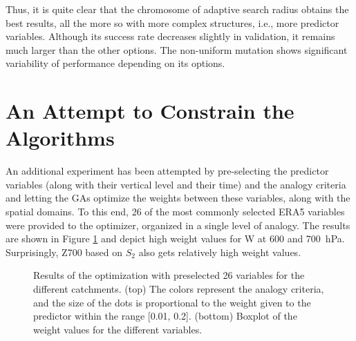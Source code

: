 \documentclass[draft]{agujournal2019}
\begin{document}
Thus, it is quite clear that the chromosome of adaptive search radius obtains the best results, all the more so with more complex structures, i.e., more predictor variables. Although its success rate decreases slightly in validation, it remains much larger than the other options. The non-uniform mutation shows significant variability of performance depending on its options.

\FloatBarrier

\section{An Attempt to Constrain the Algorithms}

An additional experiment has been attempted by pre-selecting the predictor variables (along with their vertical level and their time) and the analogy criteria and letting the GAs optimize the weights between these variables, along with the spatial domains. To this end, 26 of the most commonly selected ERA5 variables were provided to the optimizer, organized in a single level of analogy. The results are shown in Figure \ref{fig_variables_homogen} and depict high weight values for W at 600 and 700~hPa. Surprisingly, Z700 based on $S_{2}$ also gets relatively high weight values.

\begin{figure}[H]
	\noindent{}
	\vspace{-0.8cm}
	\caption{Results of the optimization with preselected 26 variables for the different catchments. (top) The colors represent the analogy criteria, and the size of the dots is proportional to the weight given to the predictor within the range [0.01, 0.2]. (bottom) Boxplot of the weight values for the different variables.}
	\label{fig_variables_homogen}
\end{figure}
\end{document}
